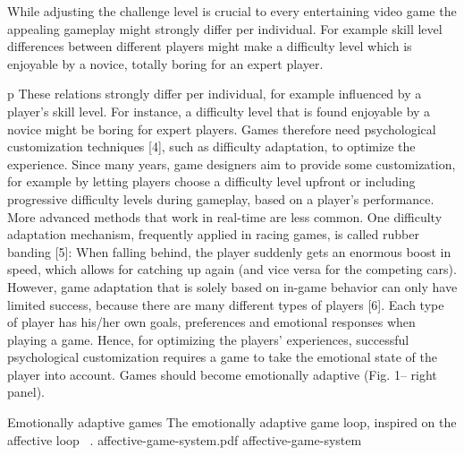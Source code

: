 While adjusting the challenge level is crucial to every entertaining video game the appealing gameplay might strongly differ per individual. For example skill level differences between different players might make a difficulty level which is enjoyable by a novice, totally boring for an expert player.

p These relations strongly differ per individual, for example influenced by a player's skill level. For instance, a difficulty level that is found enjoyable by a novice might be boring for expert players. Games therefore need psychological customization techniques [4], such as difficulty adaptation, to optimize the experience. Since many years, game designers aim to provide some customization, for example by letting players choose a difficulty level upfront or including progressive difficulty levels during gameplay, based on a player's performance. More advanced methods that work in real-time are less common. One difficulty adaptation mechanism, frequently applied in racing games, is called rubber banding [5]: When falling behind, the player suddenly gets an enormous boost in speed, which allows for catching up again (and vice versa for the competing cars). However, game adaptation that is solely based on in-game behavior can only have limited success, because there are many different types of players [6]. Each type of player has his/her own goals, preferences and emotional responses when playing a game. Hence, for optimizing the players' experiences, successful psychological customization requires a game to take the emotional state of the player into account. Games should become emotionally adaptive (Fig. 1– right panel).

\img
{Emotionally adaptive games}
{The emotionally adaptive game loop, inspired on the affective loop ~\cite{sundstrom2005user}.}
{affective-game-system.pdf}
{affective-game-system}

